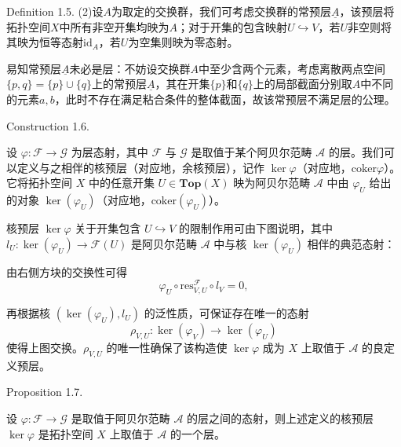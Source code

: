 \documentclass{beamer}
\begin{document}
\begin{frame}
\begin{block}{Definition 1.5.}
(2)设$A$为取定的交换群，我们可考虑交换群的常预层$\underline{A}$，该预层将拓扑空间$X$中所有非空开集均映为$A$；对于开集的包含映射$U \hookrightarrow V$，若$U$非空则将其映为恒等态射$\mathrm{id}_A$，若$U$为空集则映为零态射。

易知常预层$\underline{A}$未必是层：不妨设交换群$A$中至少含两个元素，考虑离散两点空间$\{p,q\}=\{p\}\cup\{q\}$上的常预层$\underline{A}$，其在开集$\{p\}$和$\{q\}$上的局部截面分别取$A$中不同的元素$a,b$，此时不存在满足粘合条件的整体截面，故该常预层不满足层的公理。


\end{block}
\end{frame}

\begin{frame}
\begin{block}{Construction 1.6.}


设 $\varphi: \mathcal{F} \to \mathcal{G}$ 为层态射，其中 $\mathcal{F}$ 与 $\mathcal{G}$ 是取值于某个阿贝尔范畴 $\mathcal{A}$ 的层。我们可以定义与之相伴的核预层（对应地，余核预层），记作 $\ker\varphi$（对应地，$\mathrm{coker}\varphi$）。它将拓扑空间 $X$ 中的任意开集 $U \in \mathbf{Top}(X)$ 映为阿贝尔范畴 $\mathcal{A}$ 中由 $\varphi_U$ 给出的对象 $\ker(\varphi_U)$（对应地，$\mathrm{coker}(\varphi_U)$）。

核预层 $\ker\varphi$ 关于开集包含 $U \hookrightarrow V$ 的限制作用可由下图说明，其中 $l_U: \ker(\varphi_U) \to \mathcal{F}(U)$ 是阿贝尔范畴 $\mathcal{A}$ 中与核 $\ker(\varphi_U)$ 相伴的典范态射：

由右侧方块的交换性可得
$$\varphi_U \circ \mathrm{res}_{V,U}^{\mathcal{F}} \circ l_V = 0,$$




\end{block}
\end{frame}

\begin{frame}
再根据核 $(\ker(\varphi_U), l_U)$ 的泛性质，可保证存在唯一的态射
$$\rho_{V,U}: \ker(\varphi_V) \to \ker(\varphi_U)$$
使得上图交换。$\rho_{V,U}$ 的唯一性确保了该构造使 $\ker\varphi$ 成为 $X$ 上取值于 $\mathcal{A}$ 的良定义预层。


\begin{block}{Proposition 1.7.}

设 $\varphi: \mathcal{F} \to \mathcal{G}$ 是取值于阿贝尔范畴 $\mathcal{A}$ 的层之间的态射，则上述定义的核预层 $\ker\varphi$ 是拓扑空间 $X$ 上取值于 $\mathcal{A}$ 的一个层。

\end{block}
\end{frame}
\end{document}

